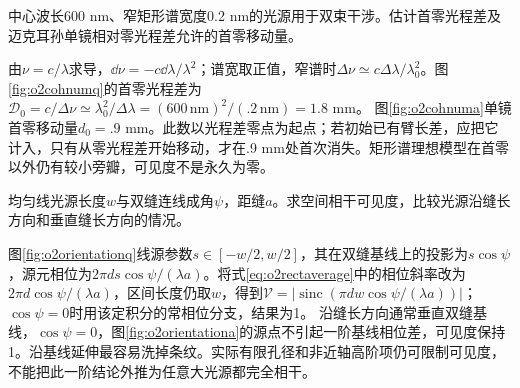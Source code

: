 \begin{exercise}\label{ex:o2coherencenum}
中心波长600 nm、窄矩形谱宽度0.2 nm的光源用于双束干涉。估计首零光程差及迈克耳孙单镜相对零光程差允许的首零移动量。
\end{exercise}
\begin{solution}
由$\nu=c/\lambda$求导，$\dd\nu=-c\dd\lambda/\lambda^2$；谱宽取正值，窄谱时$\Delta\nu\simeq c\Delta\lambda/\lambda_0^2$。图\ref{fig:o2cohnumq}的首零光程差为$\mathcal D_0=c/\Delta\nu\simeq\lambda_0^2/\Delta\lambda=(600\,\mathrm{nm})^2/(.2\,\mathrm{nm})=1.8$ mm。
图\ref{fig:o2cohnuma}单镜首零移动量$d_0=.9$ mm。此数以光程差零点为起点；若初始已有臂长差，应把它计入，只有从零光程差开始移动，才在.9 mm处首次消失。矩形谱理想模型在首零以外仍有较小旁瓣，可见度不是永久为零。
\end{solution}

\begin{exercise}\label{ex:o2sourceorientation}
均匀线光源长度$w$与双缝连线成角$\psi$，距缝$a$。求空间相干可见度，比较光源沿缝长方向和垂直缝长方向的情况。
\end{exercise}
\begin{solution}
图\ref{fig:o2orientationq}线源参数$s\in[-w/2,w/2]$，其在双缝基线上的投影为$s\cos\psi$，源元相位为$2\pi d s\cos\psi/(\lambda a)$。将式\eqref{eq:o2rectaverage}中的相位斜率改为$2\pi d\cos\psi/(\lambda a)$，区间长度仍取$w$，得到$\mathcal V=|\operatorname{sinc}(\pi dw\cos\psi/(\lambda a))|$；$\cos\psi=0$时用该定积分的常相位分支，结果为1。
沿缝长方向通常垂直双缝基线，$\cos\psi=0$，图\ref{fig:o2orientationa}的源点不引起一阶基线相位差，可见度保持1。沿基线延伸最容易洗掉条纹。实际有限孔径和非近轴高阶项仍可限制可见度，不能把此一阶结论外推为任意大光源都完全相干。
\end{solution}

